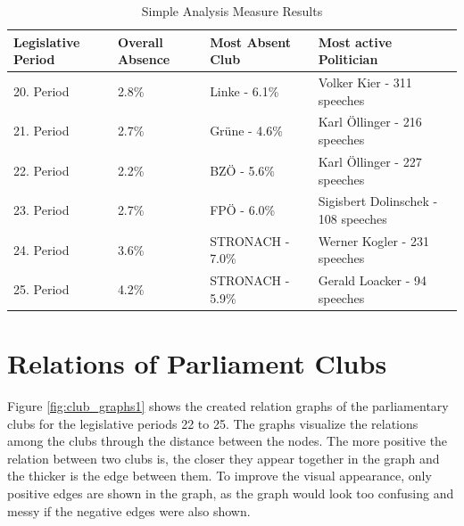 \begin{table}[h]

\centering
\bgroup
\def\arraystretch{1.2}
\begin{tabular}{| p{2cm} | p{2cm} | p{3.5cm} | p{4cm} |}
\hline
  Legislative Period & Overall Absence & Most Absent Club & Most active Politician  \\
\hline
\hline
  20. Period & 2.8\% & Linke - 6.1\% & Volker Kier - 311 speeches \\
\hline
  21. Period & 2.7\% & Grüne - 4.6\% & Karl Öllinger - 216 speeches \\
\hline
  22. Period & 2.2\% & BZÖ - 5.6\% & Karl Öllinger - 227 speeches \\
\hline
  23. Period & 2.7\% & FPÖ - 6.0\% & Sigisbert Dolinschek - 108 speeches \\
\hline
  24. Period & 3.6\% & STRONACH - 7.0\% & Werner Kogler - 231 speeches \\
\hline
  25. Period & 4.2\% & STRONACH - 5.9\% & Gerald Loacker - 94 speeches \\
\hline

\end{tabular}
\egroup

\caption{Simple Analysis Measure Results}
\label{tab:simple_analysis_results}
\end{table}

\section{Relations of Parliament Clubs}
\label{sec:relations_clubs}
Figure \ref{fig:club_graphs1} shows the created relation graphs of the parliamentary clubs for the legislative periods 22 to 25. The graphs visualize the relations among the clubs through the distance between the nodes. The more positive the relation between two clubs is, the closer they appear together in the graph and the thicker is the edge between them. To improve the visual appearance, only positive edges are shown in the graph, as the graph would look too confusing and messy if the negative edges were also shown. 

